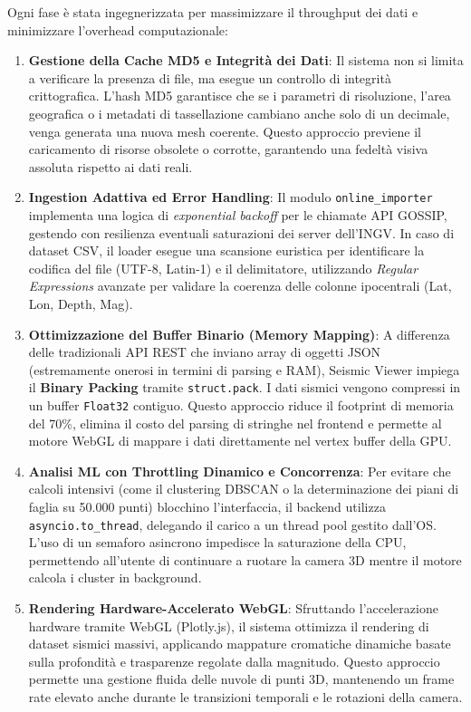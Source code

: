\documentclass[12pt,a4paper]{article}
\begin{document}
Ogni fase è stata ingegnerizzata per massimizzare il throughput dei dati e minimizzare l'overhead computazionale:
\begin{enumerate}
    \item \textbf{Gestione della Cache MD5 e Integrità dei Dati}: Il sistema non si limita a verificare la presenza di file, ma esegue un controllo di integrità crittografica. L'hash MD5 garantisce che se i parametri di risoluzione, l'area geografica o i metadati di tassellazione cambiano anche solo di un decimale, venga generata una nuova mesh coerente. Questo approccio previene il caricamento di risorse obsolete o corrotte, garantendo una fedeltà visiva assoluta rispetto ai dati reali.
    \item \textbf{Ingestion Adattiva ed Error Handling}: Il modulo \texttt{online\_importer} implementa una logica di \textit{exponential backoff} per le chiamate API GOSSIP, gestendo con resilienza eventuali saturazioni dei server dell'INGV. In caso di dataset CSV, il loader esegue una scansione euristica per identificare la codifica del file (UTF-8, Latin-1) e il delimitatore, utilizzando \textit{Regular Expressions} avanzate per validare la coerenza delle colonne ipocentrali (Lat, Lon, Depth, Mag).
    \item \textbf{Ottimizzazione del Buffer Binario (Memory Mapping)}: A differenza delle tradizionali API REST che inviano array di oggetti JSON (estremamente onerosi in termini di parsing e RAM), Seismic Viewer impiega il \textbf{Binary Packing} tramite \texttt{struct.pack}. I dati sismici vengono compressi in un buffer \texttt{Float32} contiguo. Questo approccio riduce il footprint di memoria del 70\%, elimina il costo del parsing di stringhe nel frontend e permette al motore WebGL di mappare i dati direttamente nel vertex buffer della GPU.
    \item \textbf{Analisi ML con Throttling Dinamico e Concorrenza}: Per evitare che calcoli intensivi (come il clustering DBSCAN o la determinazione dei piani di faglia su 50.000 punti) blocchino l'interfaccia, il backend utilizza \texttt{asyncio.to\_thread}, delegando il carico a un thread pool gestito dall'OS. L'uso di un semaforo asincrono impedisce la saturazione della CPU, permettendo all'utente di continuare a ruotare la camera 3D mentre il motore calcola i cluster in background.
    \item \textbf{Rendering Hardware-Accelerato WebGL}: Sfruttando l'accelerazione hardware tramite WebGL (Plotly.js), il sistema ottimizza il rendering di dataset sismici massivi, applicando mappature cromatiche dinamiche basate sulla profondità e trasparenze regolate dalla magnitudo. Questo approccio permette una gestione fluida delle nuvole di punti 3D, mantenendo un frame rate elevato anche durante le transizioni temporali e le rotazioni della camera.

\end{enumerate}
\end{document}
